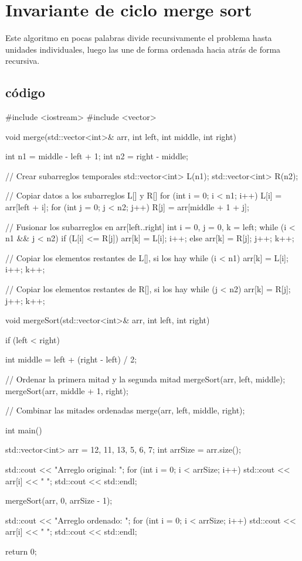 \documentclass{article}
\begin{document}
\section{Invariante de ciclo merge sort}\label{Idcms}
Este algoritmo en pocas palabras divide recursivamente el problema hasta unidades individuales, luego las une de forma ordenada hacia atrás de forma recursiva.
\subsection*{código}\label{c}

\begin{code}
#include <iostream>
#include <vector>

void merge(std::vector<int>& arr, int left, int middle, int right) {
    int n1 = middle - left + 1;
    int n2 = right - middle;

    // Crear subarreglos temporales
    std::vector<int> L(n1);
    std::vector<int> R(n2);

    // Copiar datos a los subarreglos L[] y R[]
    for (int i = 0; i < n1; i++) {
        L[i] = arr[left + i];
    }
    for (int j = 0; j < n2; j++) {
        R[j] = arr[middle + 1 + j];
    }

    // Fusionar los subarreglos en arr[left..right]
    int i = 0, j = 0, k = left;
    while (i < n1 && j < n2) {
        if (L[i] <= R[j]) {
            arr[k] = L[i];
            i++;
        } else {
            arr[k] = R[j];
            j++;
        }
        k++;
    }

    // Copiar los elementos restantes de L[], si los hay
    while (i < n1) {
        arr[k] = L[i];
        i++;
        k++;
    }

    // Copiar los elementos restantes de R[], si los hay
    while (j < n2) {
        arr[k] = R[j];
        j++;
        k++;
    }
}

void mergeSort(std::vector<int>& arr, int left, int right) {
    if (left < right) {
        int middle = left + (right - left) / 2;

        // Ordenar la primera mitad y la segunda mitad
        mergeSort(arr, left, middle);
        mergeSort(arr, middle + 1, right);

        // Combinar las mitades ordenadas
        merge(arr, left, middle, right);
    }
}

int main() {
    std::vector<int> arr = {12, 11, 13, 5, 6, 7};
    int arrSize = arr.size();

    std::cout << "Arreglo original: ";
    for (int i = 0; i < arrSize; i++) {
        std::cout << arr[i] << " ";
    }
    std::cout << std::endl;

    mergeSort(arr, 0, arrSize - 1);

    std::cout << "Arreglo ordenado: ";
    for (int i = 0; i < arrSize; i++) {
        std::cout << arr[i] << " ";
    }
    std::cout << std::endl;

    return 0;
}
\end{code}
\end{document}
